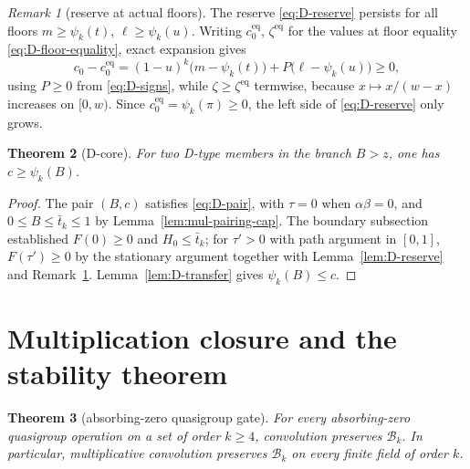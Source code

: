\documentclass[11pt]{article}
\newtheorem{theorem}{Theorem}[section]
\theoremstyle{definition}
\theoremstyle{remark}
\newtheorem{remark}[theorem]{Remark}
\newcommand{\body}{\mathcal{B}}
\begin{document}
\begin{remark}[reserve at actual floors]\label{rem:D-reserve-floors}
The reserve \eqref{eq:D-reserve} persists for all floors
$m\ge\psi_k(t)$, $\ell\ge\psi_k(u)$.  Writing $c_0^{\mathrm{eq}}$,
$\zeta^{\mathrm{eq}}$ for the values at floor equality
\eqref{eq:D-floor-equality}, exact expansion gives
\[
 c_0-c_0^{\mathrm{eq}}
 =(1-u)^k\bigl(m-\psi_k(t)\bigr)+P\bigl(\ell-\psi_k(u)\bigr)\ge0,
\]
using $P\ge0$ from \eqref{eq:D-signs}, while
$\zeta\ge\zeta^{\mathrm{eq}}$ termwise, because $x\mapsto x/(w-x)$
increases on $[0,w)$.  Since $c_0^{\mathrm{eq}}=\psi_k(\pi)\ge0$, the
left side of \eqref{eq:D-reserve} only grows.
\end{remark}

\begin{theorem}[D-core]\label{thm:D-core}
For two D-type members in the branch $B>z$, one has
$c\ge\psi_k(B)$.
\end{theorem}

\begin{proof}
The pair $(B,c)$ satisfies \eqref{eq:D-pair}, with $\tau=0$ when
$\alpha\beta=0$, and $0\le B\le\bar t_k\le1$ by
Lemma~\ref{lem:mul-pairing-cap}.  The boundary subsection established
$F(0)\ge0$ and $H_0\le\bar t_k$; for $\tau'>0$ with path argument in
$[0,1]$, $F(\tau')\ge0$ by the
stationary argument together with Lemma~\ref{lem:D-reserve} and
Remark~\ref{rem:D-reserve-floors}.  Lemma~\ref{lem:D-transfer} gives
$\psi_k(B)\le c$.
\end{proof}


\section{Multiplication closure and the stability theorem}
\label{sec:assembly}

\begin{theorem}[absorbing-zero quasigroup gate]\label{thm:multiplication}
For every absorbing-zero quasigroup operation on a set of order $k\ge4$,
convolution preserves $\body_k$.  In particular, multiplicative convolution
preserves $\body_k$ on every finite field of order $k$.
\end{theorem}
\end{document}
